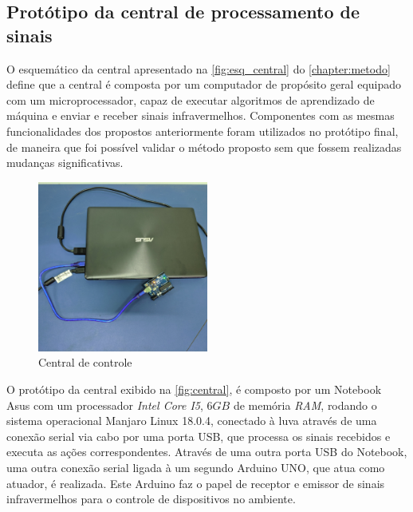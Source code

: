 \subsection{Protótipo da central de processamento de sinais}

O esquemático da central apresentado na \autoref{fig:esq_central} do \autoref{chapter:metodo} define que a central é composta por um computador de propósito geral equipado com um microprocessador, capaz de executar algoritmos de aprendizado de máquina e enviar e receber sinais infravermelhos. Componentes com as mesmas funcionalidades dos propostos anteriormente foram utilizados no protótipo final, de maneira que foi possível validar o método proposto sem que fossem realizadas mudanças significativas.

\begin{figure}[ht]
    \centering
    \includegraphics[width=0.5\textwidth, keepaspectratio]{resources/central.jpg}
    \caption{Central de controle}
    \label{fig:central}
\end{figure}

O protótipo da central exibido na \autoref{fig:central}, é composto por um Notebook Asus com um processador \textit{Intel Core I5}, $6GB$ de memória \textit{RAM}, rodando o sistema operacional Manjaro Linux 18.0.4, conectado à luva através de uma conexão serial via cabo por uma porta USB, que processa os sinais recebidos e executa as ações correspondentes. Através de uma outra porta USB do Notebook, uma outra conexão serial ligada à um segundo Arduino UNO, que atua como atuador, é realizada. Este Arduino faz o papel de receptor e emissor de sinais infravermelhos para o controle de dispositivos no ambiente. 



